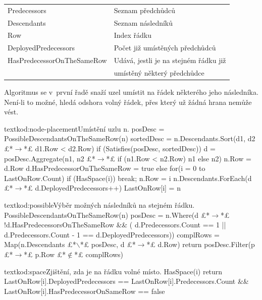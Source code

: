 \documentclass[
  biblatex,
  glossaries,
  index
]{kidiplom}
\begin{document}
\begin{table}[H]
\begin{tabular}{@{}ll@{}}
Predecessors               & Seznam předchůdců                                                 \\
Descendants                & Seznam následníků                                                 \\
Row                        & Index řádku
\\
DeployedPredecessors                        & Počet již umístěných předchůdců                                                                                         \\
HasPredecessorOnTheSameRow & Udává, jestli je na stejném řádku již\\ & umístěný
 některý předchůdce
\end{tabular}
\end{table}

Algoritmus se v~první řadě snaží uzel umístit na řádek některého jeho následníka. Není-li to možné, hledá odshora volný řádek, přes který už žádná hrana nemůže vést.

\begin{kicode}{text}{kod:node-placement}{Umístění uzlu n.}
posDesc = PossibleDescendantsOnTheSameRow(n)
sortedDesc = n.Descendants.Sort(d1, d2  £*$\to$*£ d1.Row < d2.Row)
if (Satisfies(posDesc, sortedDesc))
	d = posDesc.Aggregate(n1, n2   £*$\to$*£ if (n1.Row < n2.Row) n1 else n2)
	n.Row = d.Row
	d.HasPredecessorOnTheSameRow = true
else
	for(i = 0 to LastOnRow.Count)
		if (HasSpace(i))
			break;
	n.Row = i
n.Descendants.ForEach(d £*$\to$*£ d.DeployedPredecessors++)
LastOnRow[i] = n
\end{kicode}

\begin{kicode}{text}{kod:possible}{Výběr možných následníků na stejném řádku.}
PossibleDescendantsOnTheSameRow(n)
	posDesc = n.Where(d £*$\to$*£
		!d.HasPredecessorsOnTheSameRow && (
		d.Predecessors.Count == 1 ||
		d.Predecessors.Count - 1 == d.DeployedPredecessors))
	complRows = Map(n.Descendants £*$\smallsetminus$*£ posDesc, d £*$\!\to\!$*£ d.Row)
	return posDesc.Filter(p £*$\to$*£ p.Row £*$\not\in$*£ complRows)
\end{kicode}

\begin{kicode}{text}{kod:space}{Zjištění, zda je na řádku volné místo.}
HasSpace(i)
	return LastOnRow[i].DeployedPredecessors == 	LastOnRow[i].Predecessors.Count && 	LastOnRow[i].HasPredecessorOnSameRow == false
\end{kicode}
\end{document}
